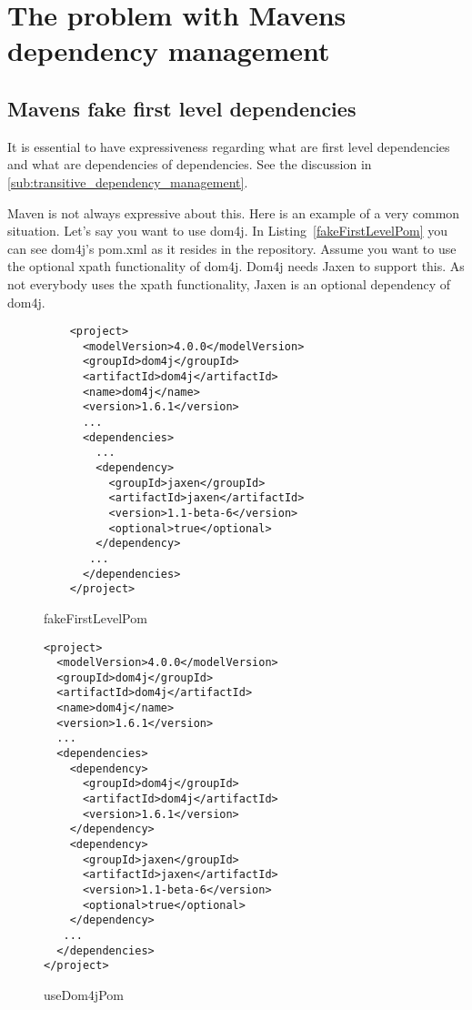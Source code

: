 \chapter{The problem with Mavens dependency management} %
\label{cha:the_problem_with_mavens_dependency_management}

\section{Mavens fake first level dependencies} %
\label{sec:mavens_fake_first_level_dependencies}

It is essential to have expressiveness regarding what are first level dependencies and what are dependencies of dependencies. See the discussion in \ref{sub:transitive_dependency_management}.

Maven is not always expressive about this. Here is an example of a very common situation. Let's say you want to use dom4j. In Listing~\ref{fakeFirstLevelPom} you can see dom4j's pom.xml as it resides in the repository. Assume you want to use the optional xpath functionality of dom4j. Dom4j needs Jaxen to support this. As not everybody uses the xpath functionality, Jaxen is an optional dependency of dom4j. 

\begin{figure}
	\caption{fakeFirstLevelPom}
	\begin{Verbatim}
	<project>
	  <modelVersion>4.0.0</modelVersion>
	  <groupId>dom4j</groupId>
	  <artifactId>dom4j</artifactId>
	  <name>dom4j</name>
	  <version>1.6.1</version>
	  ...
	  <dependencies>
	    ...
	    <dependency>
	      <groupId>jaxen</groupId>
	      <artifactId>jaxen</artifactId>
	      <version>1.1-beta-6</version>
	      <optional>true</optional>
	    </dependency>
	   ...
	  </dependencies>
	</project>	
	\end{Verbatim}	
\end{figure}

\begin{figure}
	\caption{useDom4jPom}
	\begin{Verbatim}
<project>
  <modelVersion>4.0.0</modelVersion>
  <groupId>dom4j</groupId>
  <artifactId>dom4j</artifactId>
  <name>dom4j</name>
  <version>1.6.1</version>
  ...
  <dependencies>
    <dependency>
      <groupId>dom4j</groupId>
	  <artifactId>dom4j</artifactId>
	  <version>1.6.1</version>
    </dependency>
    <dependency>
      <groupId>jaxen</groupId>
      <artifactId>jaxen</artifactId>
      <version>1.1-beta-6</version>
      <optional>true</optional>
    </dependency>
   ...
  </dependencies>
</project>	
	\end{Verbatim}	
\end{figure}

